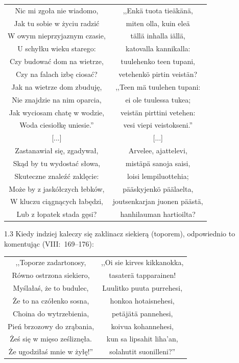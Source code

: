 \documentclass[11pt,a4paper,twoside]{report}
\begin{document}
{\centering
\small
\begin{longtable}{c c}
Nic mi zgoła nie wiadomo, 		& ,,Enkä tuota tieäkänä, \\
Jak tu sobie w życiu radzić		& miten olla, kuin eleä \\
W owym nieprzyjaznym czasie, 		& tällä inhalla iällä, \\
U schyłku wieku starego: 		& katovalla kannikalla: \\
Czy budować dom na wietrze, 		& tuulehenko teen tupani, \\
Czy na falach izbę ciosać? 		& vetehenkö pirtin veistän? \\
Jak na wietrze dom zbuduję, 		& ,,Teen mä tuulehen tupani: \\
Nie znajdzie na nim oparcia, 		& ei ole tuulessa tukea; \\
Jak wyciosam chatę w wodzie, 		& veistän pirttini vetehen: \\
Woda ciesiołkę uniesie.'' 			& vesi viepi veistokseni.'' \\
{[...]}					& {[...]}\\
Zastanawiał się, zgadywał, 		& Arvelee, ajattelevi, \\
Skąd by tu wydostać słowa, 		& mistäpä sanoja saisi, \\
Skuteczne znaleźć zaklęcie: 		& loisi lempiluottehia; \\
Może by z jaskółczych łebków, 		& pääskyjenkö päälaelta, \\
W kluczu ciągnących łabędzi, 		& joutsenkarjan juonen päästä, \\
Lub z łopatek stada gęsi? 		& hanhilauman hartioilta? \\
\end{longtable}
}
\pagebreak
\begin{spacing}{1.3}
Kiedy indziej kaleczy się zaklinacz siekierą (toporem), odpowiednio to komentując (VIII:~169--176):
\end{spacing}
{\centering
\small
\begin{longtable}{c c}
,,Toporze zadartonosy, & ,,Oi sie kirves kikkanokka, \\
Równo ostrzona siekiero, & tasaterä tapparainen! \\
Myślałaś, że to budulec, & Luulitko puuta purrehesi, \\
Że to na czółenko sosna, & honkoa hotaisnehesi, \\
Choina do wytrzebienia, & petäjätä pannehesi, \\
Pień brzozowy do zrąbania, & koivua kohannehesi, \\
Żeś się w mięso ześliznęła. & kun sa lipsahit liha'an, \\
Że ugodziłaś mnie w żyłę!'' & solahutit suonilleni?'' \\
\end{longtable}
}
\end{document}

